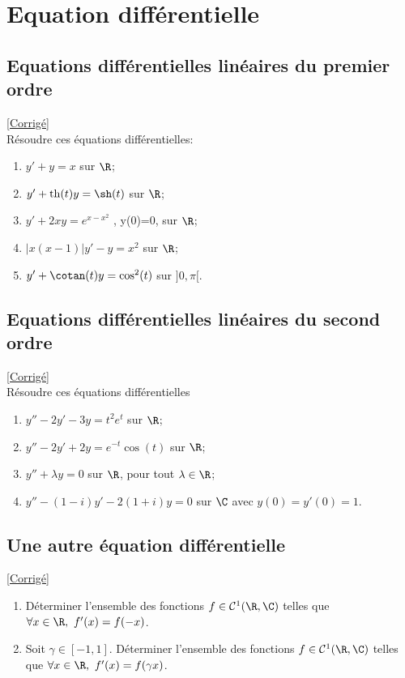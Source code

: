 \documentclass{book}
\begin{document}
\chapter{Equation différentielle}
\section{Equations différentielles linéaires du premier ordre}
\textcolor{blue}{\hyperref[sec:equations-differentielles-du-premier-ordre]{[Corrigé]}}\\
\label{Equations différentielles du premier ordre}
Résoudre ces équations différentielles:
\begin{enumerate}
	\item $y'+y=x$ sur $\R$;
	\item $y'+\operatorname{th}(t)y=\sh(t)$ sur $\R$;
	\item $y'+2xy=e^{x-x^2}$ , y(0)=0, sur $\R$;
	\item $|x(x-1)|y'-y=x^2$ sur $\R$;
	\item $y'+\cotan(t)y=\cos^2(t)$ sur $]0,\pi[$.
\end{enumerate}

\section{Equations différentielles linéaires du second ordre}
\textcolor{blue}{\hyperref[sec:equations-differentielles-du-second-ordre]{[Corrigé]}}\\
\label{Equations différentielles du second ordre}
Résoudre ces équations différentielles
\begin{enumerate}
	\item $y''-2y'-3y=t^2e^t$ sur $\R$;
	\item $y''-2y'+2y=e^{-t}\cos(t)$ sur $\R$;
	\item $y''+\lambda y=0$ sur $\R$, pour tout $\lambda\in\R$;
	\item $y''-(1-i)y'-2(1+i)y=0$ sur $\C$ avec $y(0)=y'(0)=1$.
\end{enumerate}

\section{Une autre équation différentielle }
\textcolor{blue}{\hyperref[Une autre équation différentielle corrigé]{[Corrigé]}}\\
\label{Une autre équation différentielle}
\begin{enumerate}[leftmargin=*]
	\item Déterminer l'ensemble des fonctions $f\in \mathcal C^1(\R,\C)$ telles que $\forall x\in \R,\ f'(x)=f(-x)$.
	\item Soit $\gamma\in [-1,1]$. Déterminer l'ensemble des fonctions $f\in \mathcal C^1(\R,\C)$ telles que $\forall x\in \R,\ f'(x)=f(\gamma x)$.
\end{enumerate}
\end{document}
